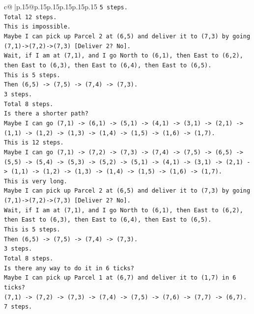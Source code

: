 \documentclass{article}
\begin{document}
{\begin{supertabular}{c@{$\;$}|p{.15\linewidth}@{}p{.15\linewidth}p{.15\linewidth}p{.15\linewidth}p{.15\linewidth}p{.15\linewidth}}
{{{\texttt{5 steps.} \\
\texttt{Total 12 steps.} \\
\texttt{This is impossible.} \\
\texttt{Maybe I can pick up Parcel 2 at (6,5) and deliver it to (7,3) by going (7,1){-}>(7,2){-}>(7,3) {[}Deliver 2? No{]}.} \\
\texttt{Wait, if I am at (7,1), and I go North to (6,1), then East to (6,2), then East to (6,3), then East to (6,4), then East to (6,5).} \\
\texttt{This is 5 steps.} \\
\texttt{Then (6,5) {-}> (7,5) {-}> (7,4) {-}> (7,3).} \\
\texttt{3 steps.} \\
\texttt{Total 8 steps.} \\
\texttt{Is there a shorter path?} \\
\texttt{Maybe I can go (7,1) {-}> (6,1) {-}> (5,1) {-}> (4,1) {-}> (3,1) {-}> (2,1) {-}> (1,1) {-}> (1,2) {-}> (1,3) {-}> (1,4) {-}> (1,5) {-}> (1,6) {-}> (1,7).} \\
\texttt{This is 12 steps.} \\
\texttt{Maybe I can go (7,1) {-}> (7,2) {-}> (7,3) {-}> (7,4) {-}> (7,5) {-}> (6,5) {-}> (5,5) {-}> (5,4) {-}> (5,3) {-}> (5,2) {-}> (5,1) {-}> (4,1) {-}> (3,1) {-}> (2,1) {-}> (1,1) {-}> (1,2) {-}> (1,3) {-}> (1,4) {-}> (1,5) {-}> (1,6) {-}> (1,7).} \\
\texttt{This is very long.} \\
\texttt{Maybe I can pick up Parcel 2 at (6,5) and deliver it to (7,3) by going (7,1){-}>(7,2){-}>(7,3) {[}Deliver 2? No{]}.} \\
\texttt{Wait, if I am at (7,1), and I go North to (6,1), then East to (6,2), then East to (6,3), then East to (6,4), then East to (6,5).} \\
\texttt{This is 5 steps.} \\
\texttt{Then (6,5) {-}> (7,5) {-}> (7,4) {-}> (7,3).} \\
\texttt{3 steps.} \\
\texttt{Total 8 steps.} \\
\texttt{Is there any way to do it in 6 ticks?} \\
\texttt{Maybe I can pick up Parcel 1 at (6,7) and deliver it to (1,7) in 6 ticks?} \\
\texttt{(7,1) {-}> (7,2) {-}> (7,3) {-}> (7,4) {-}> (7,5) {-}> (7,6) {-}> (7,7) {-}> (6,7).} \\
\texttt{7 steps.} \\
}}}
\end{supertabular}}
\end{document}
